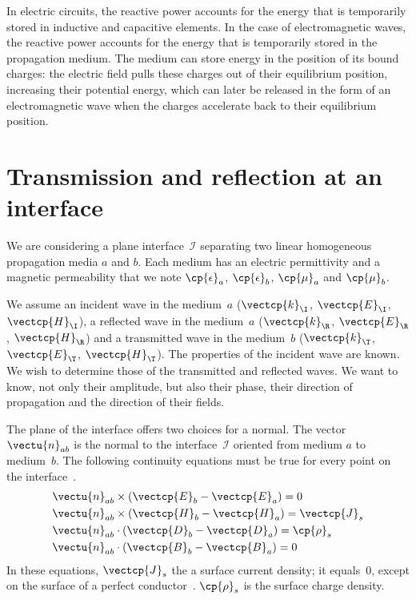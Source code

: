 \begin{refsection}
In electric circuits, the reactive power accounts for the energy that is temporarily stored in inductive and capacitive elements.
In the case of electromagnetic waves, the reactive power accounts for the energy that is temporarily stored in the propagation medium.
The medium can store energy in the position of its bound charges: the electric field pulls these charges out of their equilibrium position, increasing their potential energy, which can later be released in the form of an electromagnetic wave when the charges accelerate back to their equilibrium position.



\FloatBarrier


\section{Transmission and reflection at an interface}
\label{sec:transmission_reflection_interface}

We are considering a plane interface~$\mathcal{I}$ separating two linear homogeneous propagation media $a$ and $b$.
Each medium has an electric permittivity and a magnetic permeability that we note $\cp{\epsilon}_a$, $\cp{\epsilon}_b$, $\cp{\mu}_a$ and $\cp{\mu}_b$.

We assume
an incident wave in the medium~$a$ ($\vectcp{k}_\I$, $\vectcp{E}_\I$, $\vectcp{H}_\I$),
a reflected wave in the medium~$a$ ($\vectcp{k}_\R$, $\vectcp{E}_\R$, $\vectcp{H}_\R$)
and a transmitted wave in the medium~$b$ ($\vectcp{k}_\T$, $\vectcp{E}_\T$, $\vectcp{H}_\T$).
The properties of the incident wave are known.
We wish to determine those of the transmitted and reflected waves.
We want to know, not only their amplitude, but also their phase, their direction of propagation and the direction of their fields.

The plane of the interface offers two choices for a normal.
The vector~$\vectu{n}_{ab}$ is the normal to the interface~$\mathcal{I}$ oriented from medium $a$ to medium~$b$.
The following continuity equations must be true for every point on the interface~\parencite{stratton1941electromagnetic}.
\begin{align}
    &\vectu{n}_{ab} \times (\vectcp{E}_b - \vectcp{E}_a) = 0 \\
    &\vectu{n}_{ab} \times (\vectcp{H}_b - \vectcp{H}_a) = \vectcp{J}_s \\
    &\vectu{n}_{ab} \cdot  (\vectcp{D}_b - \vectcp{D}_a) = \cp{\rho}_s \\
    &\vectu{n}_{ab} \cdot  (\vectcp{B}_b - \vectcp{B}_a) = 0
\end{align}
In these equations, $\vectcp{J}_s$ the a surface current density;
it equals~0, except on the surface of a perfect conductor~\parencite{stratton1941electromagnetic}.
$\cp{\rho}_s$ is the surface charge density.


\end{refsection}
